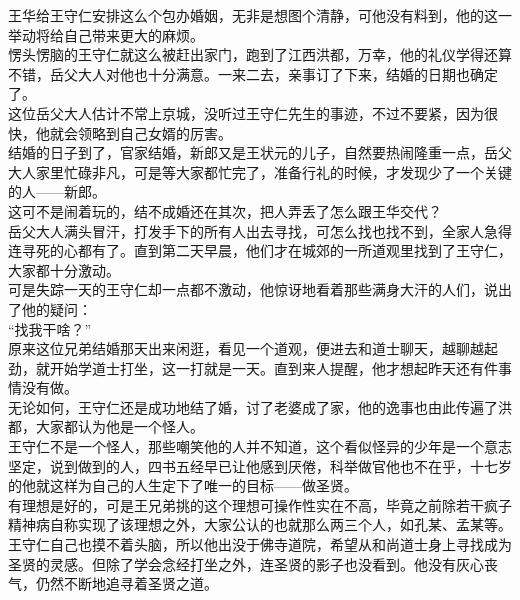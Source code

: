 \begin{multicols}{\theparacolNo}
王华给王守仁安排这么个包办婚姻，无非是想图个清静，可他没有料到，他的这一举动将给自己带来更大的麻烦。\\

愣头愣脑的王守仁就这么被赶出家门，跑到了江西洪都，万幸，他的礼仪学得还算不错，岳父大人对他也十分满意。一来二去，亲事订了下来，结婚的日期也确定了。\\

这位岳父大人估计不常上京城，没听过王守仁先生的事迹，不过不要紧，因为很快，他就会领略到自己女婿的厉害。\\

结婚的日子到了，官家结婚，新郎又是王状元的儿子，自然要热闹隆重一点，岳父大人家里忙碌非凡，可是等大家都忙完了，准备行礼的时候，才发现少了一个关键的人——新郎。\\

这可不是闹着玩的，结不成婚还在其次，把人弄丢了怎么跟王华交代？\\

岳父大人满头冒汗，打发手下的所有人出去寻找，可怎么找也找不到，全家人急得连寻死的心都有了。直到第二天早晨，他们才在城郊的一所道观里找到了王守仁，大家都十分激动。\\

可是失踪一天的王守仁却一点都不激动，他惊讶地看着那些满身大汗的人们，说出了他的疑问：\\

“找我干啥？”\\

原来这位兄弟结婚那天出来闲逛，看见一个道观，便进去和道士聊天，越聊越起劲，就开始学道士打坐，这一打就是一天。直到来人提醒，他才想起昨天还有件事情没有做。\\

无论如何，王守仁还是成功地结了婚，讨了老婆成了家，他的逸事也由此传遍了洪都，大家都认为他是一个怪人。\\

王守仁不是一个怪人，那些嘲笑他的人并不知道，这个看似怪异的少年是一个意志坚定，说到做到的人，四书五经早已让他感到厌倦，科举做官他也不在乎，十七岁的他就这样为自己的人生定下了唯一的目标——做圣贤。\\

有理想是好的，可是王兄弟挑的这个理想可操作性实在不高，毕竟之前除若干疯子精神病自称实现了该理想之外，大家公认的也就那么两三个人，如孔某、孟某等。\\

王守仁自己也摸不着头脑，所以他出没于佛寺道院，希望从和尚道士身上寻找成为圣贤的灵感。但除了学会念经打坐之外，连圣贤的影子也没看到。他没有灰心丧气，仍然不断地追寻着圣贤之道。\\


\end{multicols}
